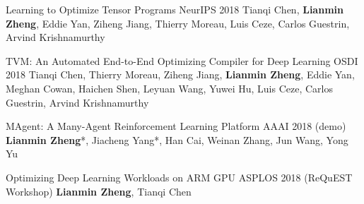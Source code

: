 

\begin{cventries}

  \cventry
	{}
	{Learning to Optimize Tensor Programs} %
	{NeurIPS 2018} %
	{} %
	{Tianqi Chen, \textbf{Lianmin Zheng}, Eddie Yan, Ziheng Jiang, Thierry Moreau, Luis Ceze, Carlos Guestrin, Arvind Krishnamurthy}

  \cventry
    {}
    {TVM: An Automated End-to-End Optimizing Compiler for Deep Learning} %
    {OSDI 2018} %
    {} %
    {Tianqi Chen, Thierry Moreau, Ziheng Jiang, \textbf{Lianmin Zheng}, Eddie Yan, Meghan Cowan, Haichen Shen, Leyuan Wang, Yuwei Hu, Luis Ceze, Carlos Guestrin, Arvind Krishnamurthy}

  \cventry
	{}
	{MAgent: A Many-Agent Reinforcement Learning Platform} %
	{AAAI 2018 (demo)} %
	{} %
	{\textbf{Lianmin Zheng}*, Jiacheng Yang*, Han Cai, Weinan Zhang, Jun Wang, Yong Yu}

  \cventry
	{}
	{Optimizing Deep Learning Workloads on ARM GPU} %
	{ASPLOS 2018 (ReQuEST Workshop)} %
	{} %
	{\textbf{Lianmin Zheng}, Tianqi Chen}

\end{cventries}
